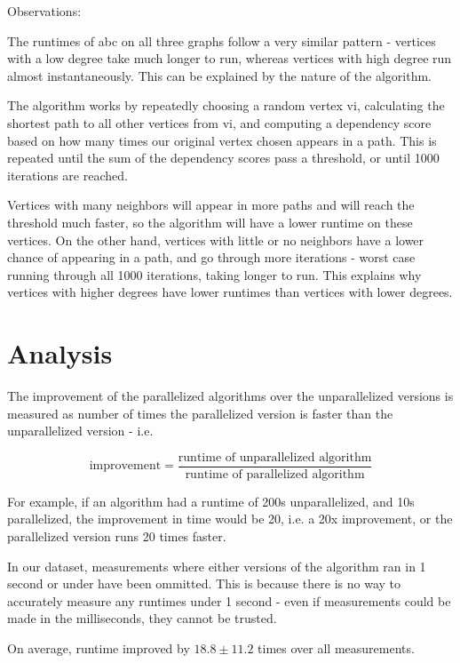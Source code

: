 \documentclass[12pt]{article}
\begin{document}
Observations:

The runtimes of abc on all three graphs follow a very similar pattern - vertices with a low degree take much longer to run, whereas vertices with high degree run almost instantaneously. This can be explained by the nature of the algorithm.

The algorithm works by repeatedly choosing a random vertex vi, calculating the shortest path to all other vertices from vi, and computing a dependency score based on how many times our original vertex chosen appears in a path. This is repeated until the sum of the dependency scores pass a threshold, or until 1000 iterations are reached.

Vertices with many neighbors will appear in more paths and will reach the threshold much faster, so the algorithm will have a lower runtime on these vertices. On the other hand, vertices with little or no neighbors have a lower chance of appearing in a path, and go through more iterations - worst case running through all 1000 iterations, taking longer to run. This explains why vertices with higher degrees have lower runtimes than vertices with lower degrees.

\section{Analysis}

The improvement of the parallelized algorithms over the unparallelized versions is measured as number of times the parallelized version is faster than the unparallelized version - i.e. 

$$ \text{improvement} = \frac{\text{runtime of unparallelized algorithm}}{\text{runtime of parallelized algorithm}} $$

For example, if an algorithm had a runtime of 200s unparallelized, and 10s parallelized, the improvement in time would be 20, i.e. a 20x improvement, or the parallelized version runs 20 times faster.

In our dataset, measurements where either versions of the algorithm ran in 1 second or under have been ommitted. This is because there is no way to accurately measure any runtimes under 1 second - even if measurements could be made in the milliseconds, they cannot be trusted.

On average, runtime improved by $18.8 \pm 11.2$ times over all measurements.
\end{document}
